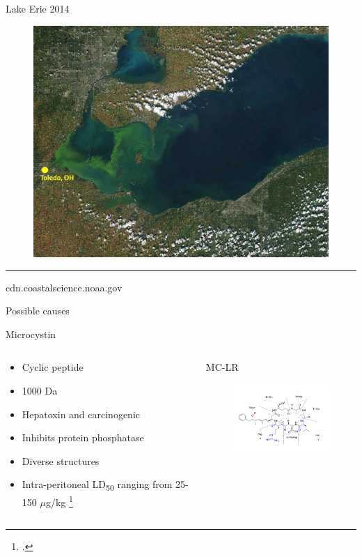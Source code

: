 \begin{frame}{Lake Erie 2014}
	\begin{figure}
		\centering
		\includegraphics[scale=0.35]{erie.jpg}
	\end{figure}
\hrule
{\tiny cdn.coastalscience.noaa.gov}
\end{frame}
\begin{frame}{Possible causes}

\end{frame}
\begin{frame}{Microcystin}

\begin{columns}
	\begin{column}{0.5\textwidth}

	\begin{itemize}
		\item Cyclic peptide
		\item 1000 Da
		\item Hepatoxin and carcinogenic
		\item Inhibits protein phosphatase
		\item Diverse structures 
		\item Intra-peritoneal LD\textsubscript{50} ranging from 25-150 $\mu$g/kg  \footcite{dittmann_cyanobacterial_2012}

	\end{itemize}
	\end{column}
	\begin{column}{0.3\textwidth}
		MC-LR
\begin{figure}[ht]
	\centering
	\hspace*{-10cm}
	\includegraphics[width=2in]{../figures/Microcystin-LR.png}
\end{figure}
	\end{column}
\end{columns}

\end{frame}
